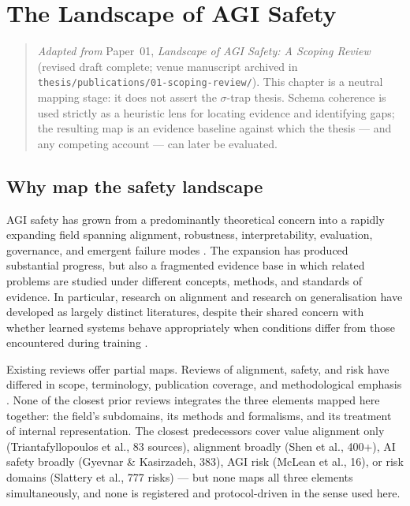 \chapter{The Landscape of AGI Safety}
\label{ch:agi-safety-landscape}

\graphicspath{{chapters/02-agi-safety-landscape/figures/}}

\begin{quote}
\emph{Adapted from} Paper~01, \emph{Landscape of AGI Safety: A Scoping Review}
(revised draft complete; venue manuscript archived in \texttt{thesis/publications/01-scoping-review/}).
This chapter is a neutral mapping stage: it does not assert the $\sigma$-trap thesis.
Schema coherence is used strictly as a heuristic lens for locating evidence and
identifying gaps; the resulting map is an evidence baseline against which the thesis
--- and any competing account --- can later be evaluated.
\end{quote}

\section{Why map the safety landscape}

AGI safety has grown from a predominantly theoretical concern into a rapidly expanding
field spanning alignment, robustness, interpretability, evaluation, governance, and
emergent failure modes \citep{hendrycks2023overview,hendrycks2021unsolved,ji2023survey}.
The expansion has produced substantial progress, but also a fragmented evidence base in
which related problems are studied under different concepts, methods, and standards of
evidence. In particular, research on alignment and research on generalisation have
developed as largely distinct literatures, despite their shared concern with whether
learned systems behave appropriately when conditions differ from those encountered
during training \citep{amodei2016concrete,lake2018generalization,keysers2020measuring,
geirhos2020shortcut,hupkes2023taxonomy}.

Existing reviews offer partial maps. Reviews of alignment, safety, and risk have
differed in scope, terminology, publication coverage, and methodological emphasis
\citep{triantafyllopoulos2026value,shen2024bidirectional,gyevnar2025aisafety,
mclean2021risks,slattery2024ai,ahmed2024future}. None of the closest prior reviews
integrates the three elements mapped here together: the field's subdomains, its methods
and formalisms, and its treatment of internal representation. The closest predecessors
cover value alignment only (Triantafyllopoulos et al., 83 sources), alignment broadly
(Shen et al., 400+), AI safety broadly (Gyevnar \& Kasirzadeh, 383), AGI risk (McLean
et al., 16), or risk domains (Slattery et al., 777 risks) --- but none maps all three
elements simultaneously, and none is registered and protocol-driven in the sense used
here.

